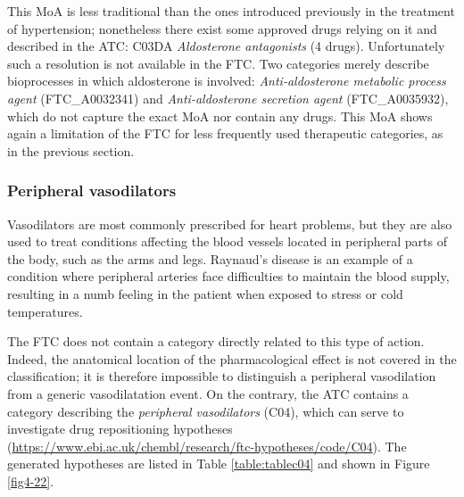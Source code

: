 This MoA is less traditional than the ones introduced previously in the treatment of hypertension; nonetheless there exist some approved drugs relying on it and described in the ATC: C03DA \emph{Aldosterone antagonists} (4 drugs). Unfortunately such a resolution is not available in the FTC. Two categories merely describe bioprocesses in which aldosterone is involved: \emph{Anti-aldosterone metabolic process agent} (FTC\_A0032341) and \emph{Anti-aldosterone secretion agent} (FTC\_A0035932), which do not capture the exact MoA nor contain any drugs. This MoA shows again a limitation of the FTC for less frequently used therapeutic categories, as in the previous section.

\subsubsection{Peripheral vasodilators}
Vasodilators are most commonly prescribed for heart problems, but they are also used to treat conditions affecting the blood vessels located in peripheral parts of the body, such as the arms and legs. Raynaud's disease is an example of a condition where peripheral arteries face difficulties to maintain the blood supply, resulting in a numb feeling in the patient when exposed to stress or cold temperatures.

The FTC does not contain a category directly related to this type of action. Indeed, the anatomical location of the pharmacological effect is not covered in the classification; it is therefore impossible to distinguish a peripheral vasodilation from a generic vasodilatation event. On the contrary, the ATC contains a category describing the \emph{peripheral vasodilators} (C04), which can serve to investigate drug repositioning hypotheses (\url{https://www.ebi.ac.uk/chembl/research/ftc-hypotheses/code/C04}). The generated hypotheses are listed in Table \ref{table:tablec04} and shown in Figure \ref{fig4-22}.

